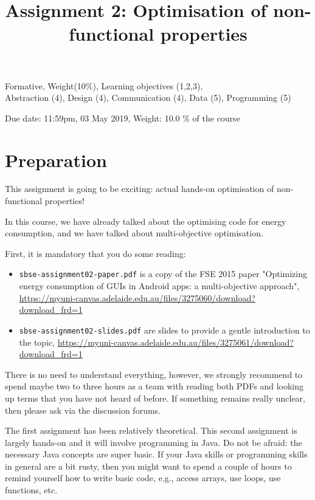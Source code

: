 \documentclass{pracs}
\newcommand{\duedate}{03 May 2019}
\begin{document}
\title{Assignment 2: Optimisation of non-functional properties}
\maketitle
\thispagestyle{fancy}


	Formative, 	Weight(10\%), 	Learning objectives (1,2,3),\\
 	Abstraction (4), 	Design (4), 	Communication (4), 	Data (5),	Programming (5)


\begin{center}
Due date: 11:59pm, \duedate, Weight: 10.0 \% of the course
\end{center}

\sloppy

\section*{Preparation}

This assignment is going to be exciting: actual hands-on optimisation of non-functional properties!

In this course, we have already talked about the optimising code for energy consumption, and we have talked about multi-objective optimisation.

First, it is mandatory that you do some reading: 

\begin{itemize}
\item \texttt{sbse-assignment02-paper.pdf} is a copy of the FSE 2015 paper "Optimizing energy consumption of GUIs in Android apps: a multi-objective approach", \url{https://myuni-canvas.adelaide.edu.au/files/3275060/download?download_frd=1}
\item \texttt{sbse-assignment02-slides.pdf} are slides to provide a gentle introduction to the topic, \url{https://myuni-canvas.adelaide.edu.au/files/3275061/download?download_frd=1}
\end{itemize}

There is no need to understand everything, however, we strongly recommend to spend maybe two to three hours as a team with reading both PDFs and looking up terms that you have not heard of before. If something remains really unclear, then please ask via the discussion forums. 

The first assignment has been relatively theoretical. This second assignment is largely hands-on and it will involve programming in Java. Do not be afraid: the necessary Java concepts are super basic. If your Java skills or programming skills in general are a bit rusty, then you might want to spend a couple of hours to remind yourself how to write basic code, e.g., access arrays, use loops, use functions, etc.
\end{document}
